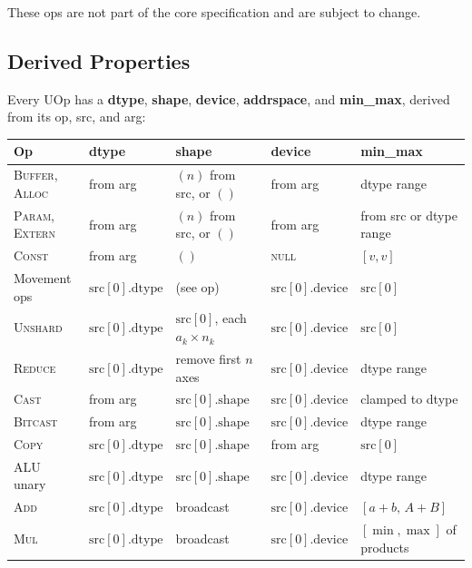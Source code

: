 \documentclass[10pt,letterpaper]{article}
\newcommand{\op}[1]{\textsc{#1}}
\begin{document}
\smallskip
These ops are not part of the core specification and are subject to change.

\subsection*{Derived Properties}

Every UOp has a \textbf{dtype}, \textbf{shape}, \textbf{device}, \textbf{addrspace}, and \textbf{min\_max}, derived from its op, src, and arg:

\medskip
\begin{tabular}{@{}l l l l l@{}}
\toprule
\textbf{Op} & \textbf{dtype} & \textbf{shape} & \textbf{device} & \textbf{min\_max} \\
\midrule
\op{Buffer}, \op{Alloc} & from arg & $(n)$ from src, or $()$ & from arg & dtype range \\
\op{Param}, \op{Extern} & from arg & $(n)$ from src, or $()$ & from arg & from src or dtype range \\
\op{Const} & from arg & $()$ & \textsc{null} & $[v, v]$ \\[3pt]
Movement ops & $\mathrm{src}[0].\mathrm{dtype}$ & (see op) & $\mathrm{src}[0].\mathrm{device}$ & $\mathrm{src}[0]$ \\
\op{Unshard} & $\mathrm{src}[0].\mathrm{dtype}$ & $\mathrm{src}[0]$, each $a_k \times n_k$ & $\mathrm{src}[0].\mathrm{device}$ & $\mathrm{src}[0]$ \\
\op{Reduce} & $\mathrm{src}[0].\mathrm{dtype}$ & remove first $n$ axes & $\mathrm{src}[0].\mathrm{device}$ & dtype range \\[3pt]
\op{Cast} & from arg & $\mathrm{src}[0].\mathrm{shape}$ & $\mathrm{src}[0].\mathrm{device}$ & clamped to dtype \\
\op{Bitcast} & from arg & $\mathrm{src}[0].\mathrm{shape}$ & $\mathrm{src}[0].\mathrm{device}$ & dtype range \\
\op{Copy} & $\mathrm{src}[0].\mathrm{dtype}$ & $\mathrm{src}[0].\mathrm{shape}$ & from arg & $\mathrm{src}[0]$ \\
ALU unary & $\mathrm{src}[0].\mathrm{dtype}$ & $\mathrm{src}[0].\mathrm{shape}$ & $\mathrm{src}[0].\mathrm{device}$ & dtype range \\
\op{Add} & $\mathrm{src}[0].\mathrm{dtype}$ & broadcast & $\mathrm{src}[0].\mathrm{device}$ & $[a+b,\, A+B]$ \\
\op{Mul} & $\mathrm{src}[0].\mathrm{dtype}$ & broadcast & $\mathrm{src}[0].\mathrm{device}$ & $[\min,\max]$ of products \\

\end{tabular}
\end{document}
